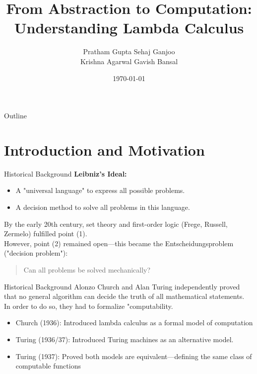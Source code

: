\documentclass{beamer}
\title{From Abstraction to Computation: \\ Understanding Lambda Calculus}
\author{Pratham Gupta Sehaj Ganjoo\\
        Krishna Agarwal Gavish Bansal}
\institute{Indian Institute of Science, Bengaluru}
\date{\today}
\begin{document}
\begin{frame}
  \titlepage
\end{frame}

\begin{frame}{Outline}
  \tableofcontents
\end{frame}

\section{Introduction and Motivation}

\begin{frame}{Historical Background}
\textbf{Leibniz’s Ideal:}
\begin{itemize}
    \item A "universal language" to express all possible problems.
    \item A decision method to solve all problems in this language.
\end{itemize}
\bigskip
By the early 20th century, set theory and first-order logic (Frege, Russell, Zermelo) fulfilled point (1).\\
However, point (2) remained open—this became the Entscheidungsproblem ("decision problem"):\\
\begin{quote}
    Can all problems be solved mechanically?
\end{quote}
\end{frame}
\begin{frame}{Historical Background}
Alonzo Church and Alan Turing independently proved that no general algorithm can decide the truth of all mathematical statements.\\
In order to do so, they had to formalize "computability.\\
\begin{itemize}
    \item Church (1936): Introduced lambda calculus as a formal model of computation
    \item Turing (1936/37): Introduced Turing machines as an alternative model.
    \item Turing (1937): Proved both models are equivalent—defining the same class of computable functions
\end{itemize}

\end{frame}
\end{document}
